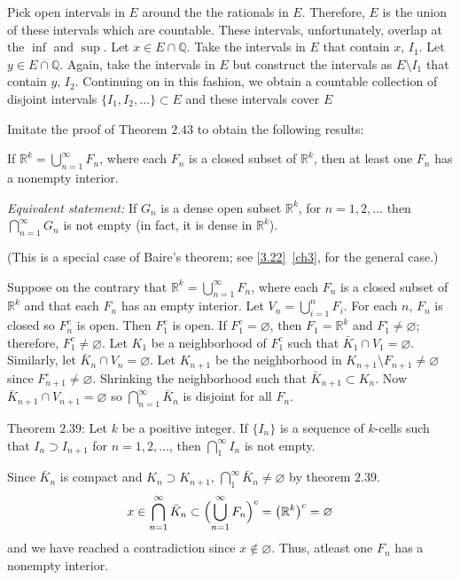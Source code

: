 \begin{exercise}
  Pick open intervals in \(E\) around the the rationals in \(E\).
  Therefore, \(E\) is the union of these intervals which are countable.
  These intervals, unfortunately, overlap at the \(\inf\) and \(\sup\).
  Let \(x\in E\cap\mathbb{Q}\).
  Take the intervals in \(E\) that contain \(x\), \(I_1\).
  Let \(y\in E\cap\mathbb{Q}\).
  Again, take the intervals in \(E\) but construct the intervals as
  \(E\setminus I_1\) that contain \(y\), \(I_2\).
  Continuing on in this fashion, we obtain a countable collection of disjoint
  intervals \(\{I_1,I_2,\ldots\}\subset E\) and these intervals cover \(E\)
\item
  Imitate the proof of Theorem \(2.43\) to obtain the following results:
  \par\smallskip
  If \(\mathbb{R}^k = \bigcup_{n = 1}^{\infty}F_n\), where each \(F_n\) is a
  closed subset of \(\mathbb{R}^k\), then at least one \(F_n\) has a nonempty
  interior.
  \par\smallskip
  \textit{Equivalent statement:} If \(G_n\) is a dense open subset
  \(\mathbb{R}^k\), for \(n = 1,2,\ldots\) then
  \(\bigcap_{n = 1}^{\infty}G_n\) is not empty (in fact, it is dense in
  \(\mathbb{R}^k\)).
  \par\smallskip
  (This is a special case of Baire's theorem; see \cref{3.22}~\cref{ch3}, for
  the general case.)
  \par\smallskip
  Suppose on the contrary that \(\mathbb{R}^k = \bigcup_{n = 1}^{\infty}F_n\),
  where each \(F_n\) is a closed subset of \(\mathbb{R}^k\) and that each
  \(F_n\) has an empty interior.
  Let \(V_n = \bigcup_{i = 1}^nF_i\).
  For each \(n\), \(F_n\)  is closed so \(F_n^c\) is open.
  Then \(F_1^c\) is open.
  If \(F_1^c = \varnothing\), then \(F_1 = \mathbb{R}^k\) and
  \(F_1^{\circ}\neq\varnothing\); therefore, \(F_1^c\neq\varnothing\).
  Let \(K_1\) be a neighborhood of \(F_1^c\) such that
  \(\bar{K}_1\cap V_1 = \varnothing\).
  Similarly, let \(\bar{K}_n\cap V_n = \varnothing\).
  Let \(K_{n + 1}\) be the neighborhood in
  \(K_{n + 1}\setminus F_{n + 1}\neq\varnothing\) since
  \(F_{n + 1}^{\circ}\neq\varnothing\).
  Shrinking the neighborhood such that \(\bar{K}_{n + 1}\subset K_n\).
  Now \(\bar{K}_{n + 1}\cap V_{n + 1} = \varnothing\) so
  \(\bigcap_{n = 1}^{\infty}\bar{K}_n\) is disjoint for all \(F_n\).
  \par\smallskip
  Theorem \(2.39\): Let \(k\) be a positive integer.
  If \(\{I_n\}\) is a sequence of \(k\)-cells such that
  \(I_n\supset I_{n + 1}\) for \(n = 1,2,\ldots\), then
  \(\bigcap_1^{\infty}I_n\) is not empty.
  \par\smallskip
  Since \(\bar{K}_n\) is compact and \(K_n\supset K_{n + 1}\),
  \(\bigcap_1^{\infty}\bar{K}_n\neq\varnothing\) by theorem \(2.39\).
  \[
  x\in\bigcap_{n = 1}^{\infty}\bar{K}_n\subset
  \Bigl(\bigcup_{n = 1}^{\infty}F_n\Bigr)^c = \bigl(\mathbb{R}^k\bigr)^c
  = \varnothing
  \]
  and we have reached a contradiction since \(x\not\in\varnothing\).
  Thus, atleast one \(F_n\) has a nonempty interior.
\end{exercise}

